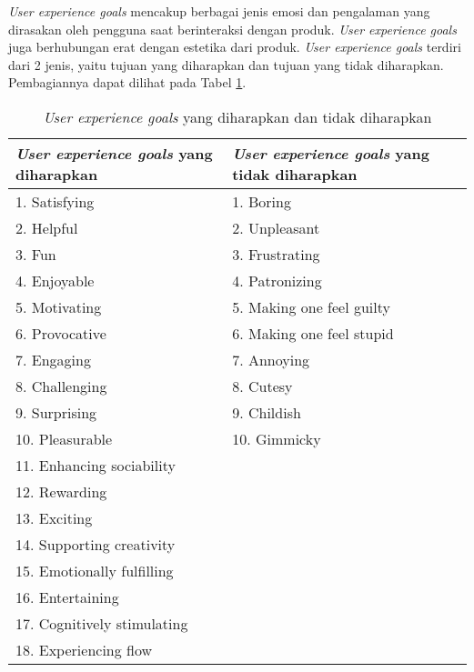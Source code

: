 \textit{User experience goals} mencakup berbagai jenis emosi dan pengalaman yang dirasakan oleh pengguna saat berinteraksi dengan produk. \textit{User experience goals} juga berhubungan erat dengan estetika dari produk. \textit{User experience goals} terdiri dari 2 jenis, yaitu tujuan yang diharapkan dan tujuan yang tidak diharapkan. \parencite{saffer2010designing} Pembagiannya dapat dilihat pada Tabel \ref{tab:ux_goals}.

\begin{table}[h]
  \fontsize{10}{12}
  \caption{\textit{User experience goals} yang diharapkan dan tidak diharapkan}
  \label{tab:ux_goals}
  \vspace{0.25cm}
  \begin{center}
      \begin{tabular}{|l|l|}
            \hline
            \textit{User experience goals} yang diharapkan & \textit{User experience goals} yang tidak diharapkan \tabularnewline
            \hline
            1.	Satisfying              & 1.  Boring                  \tabularnewline
            2.	Helpful                 & 2.  Unpleasant              \tabularnewline
            3.	Fun                     & 3.  Frustrating             \tabularnewline
            4.	Enjoyable               & 4.  Patronizing             \tabularnewline
            5.	Motivating              & 5.  Making one feel guilty  \tabularnewline
            6.	Provocative             & 6.  Making one feel stupid  \tabularnewline
            7.	Engaging                & 7.  Annoying                \tabularnewline
            8.	Challenging             & 8.  Cutesy                  \tabularnewline
            9.	Surprising              & 9.  Childish                \tabularnewline
            10.	Pleasurable             & 10. Gimmicky                \tabularnewline
            11.	Enhancing sociability   &                             \tabularnewline
            12.	Rewarding               &                             \tabularnewline
            13.	Exciting                &                             \tabularnewline
            14.	Supporting creativity   &                             \tabularnewline
            15.	Emotionally fulfilling  &                             \tabularnewline
            16.	Entertaining            &                             \tabularnewline
            17.	Cognitively stimulating &                             \tabularnewline
            18.	Experiencing flow       &                             \tabularnewline
            \hline
        \end{tabular}
    \end{center}
\end{table}


